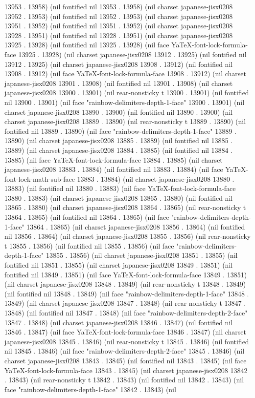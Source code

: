 13953 . 13958) (nil fontified nil 13953 . 13958) (nil charset japanese-jisx0208 13952 . 13953) (nil fontified nil 13952 . 13953) (nil charset japanese-jisx0208 13951 . 13952) (nil fontified nil 13951 . 13952) (nil charset japanese-jisx0208 13928 . 13951) (nil fontified nil 13928 . 13951) (nil charset japanese-jisx0208 13925 . 13928) (nil fontified nil 13925 . 13928) (nil face YaTeX-font-lock-formula-face 13925 . 13928) (nil charset japanese-jisx0208 13912 . 13925) (nil fontified nil 13912 . 13925) (nil charset japanese-jisx0208 13908 . 13912) (nil fontified nil 13908 . 13912) (nil face YaTeX-font-lock-formula-face 13908 . 13912) (nil charset japanese-jisx0208 13901 . 13908) (nil fontified nil 13901 . 13908) (nil charset japanese-jisx0208 13900 . 13901) (nil rear-nonsticky t 13900 . 13901) (nil fontified nil 13900 . 13901) (nil face "rainbow-delimiters-depth-1-face" 13900 . 13901) (nil charset japanese-jisx0208 13890 . 13900) (nil fontified nil 13890 . 13900) (nil charset japanese-jisx0208 13889 . 13890) (nil rear-nonsticky t 13889 . 13890) (nil fontified nil 13889 . 13890) (nil face "rainbow-delimiters-depth-1-face" 13889 . 13890) (nil charset japanese-jisx0208 13885 . 13889) (nil fontified nil 13885 . 13889) (nil charset japanese-jisx0208 13884 . 13885) (nil fontified nil 13884 . 13885) (nil face YaTeX-font-lock-formula-face 13884 . 13885) (nil charset japanese-jisx0208 13883 . 13884) (nil fontified nil 13883 . 13884) (nil face YaTeX-font-lock-math-sub-face 13883 . 13884) (nil charset japanese-jisx0208 13880 . 13883) (nil fontified nil 13880 . 13883) (nil face YaTeX-font-lock-formula-face 13880 . 13883) (nil charset japanese-jisx0208 13865 . 13880) (nil fontified nil 13865 . 13880) (nil charset japanese-jisx0208 13864 . 13865) (nil rear-nonsticky t 13864 . 13865) (nil fontified nil 13864 . 13865) (nil face "rainbow-delimiters-depth-1-face" 13864 . 13865) (nil charset japanese-jisx0208 13856 . 13864) (nil fontified nil 13856 . 13864) (nil charset japanese-jisx0208 13855 . 13856) (nil rear-nonsticky t 13855 . 13856) (nil fontified nil 13855 . 13856) (nil face "rainbow-delimiters-depth-1-face" 13855 . 13856) (nil charset japanese-jisx0208 13851 . 13855) (nil fontified nil 13851 . 13855) (nil charset japanese-jisx0208 13849 . 13851) (nil fontified nil 13849 . 13851) (nil face YaTeX-font-lock-formula-face 13849 . 13851) (nil charset japanese-jisx0208 13848 . 13849) (nil rear-nonsticky t 13848 . 13849) (nil fontified nil 13848 . 13849) (nil face "rainbow-delimiters-depth-1-face" 13848 . 13849) (nil charset japanese-jisx0208 13847 . 13848) (nil rear-nonsticky t 13847 . 13848) (nil fontified nil 13847 . 13848) (nil face "rainbow-delimiters-depth-2-face" 13847 . 13848) (nil charset japanese-jisx0208 13846 . 13847) (nil fontified nil 13846 . 13847) (nil face YaTeX-font-lock-formula-face 13846 . 13847) (nil charset japanese-jisx0208 13845 . 13846) (nil rear-nonsticky t 13845 . 13846) (nil fontified nil 13845 . 13846) (nil face "rainbow-delimiters-depth-2-face" 13845 . 13846) (nil charset japanese-jisx0208 13843 . 13845) (nil fontified nil 13843 . 13845) (nil face YaTeX-font-lock-formula-face 13843 . 13845) (nil charset japanese-jisx0208 13842 . 13843) (nil rear-nonsticky t 13842 . 13843) (nil fontified nil 13842 . 13843) (nil face "rainbow-delimiters-depth-1-face" 13842 . 13843) (nil 